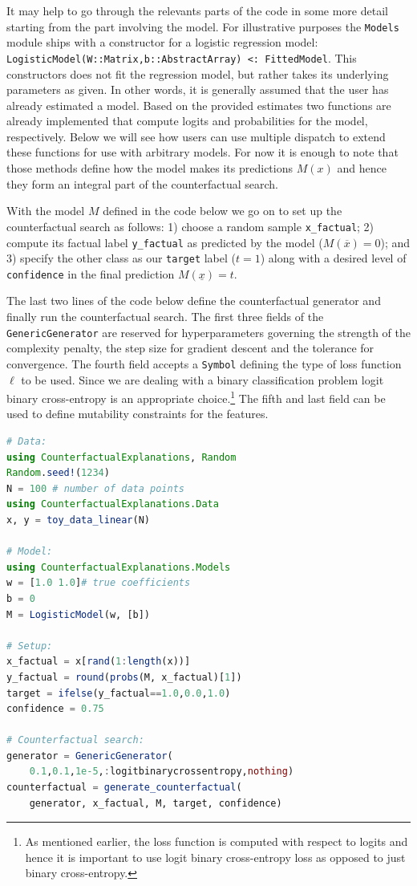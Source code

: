 \documentclass{juliacon}
\begin{document}
It may help to go through the relevants parts of the code in some more
detail starting from the part involving the model. For illustrative
purposes the \texttt{Models} module ships with a constructor for a
logistic regression model:
\texttt{LogisticModel(W::Matrix,b::AbstractArray)\ \textless{}:\ FittedModel}.
This constructors does not fit the regression model, but rather takes
its underlying parameters as given. In other words, it is generally
assumed that the user has already estimated a model. Based on the
provided estimates two functions are already implemented that compute
logits and probabilities for the model, respectively. Below we will see
how users can use multiple dispatch to extend these functions for use
with arbitrary models. For now it is enough to note that those methods
define how the model makes its predictions \(M(x)\) and hence they form
an integral part of the counterfactual search.

With the model \(M\) defined in the code below we go on to set up the
counterfactual search as follows: 1) choose a random sample
\texttt{x\_factual}; 2) compute its factual label \texttt{y\_factual} as
predicted by the model (\(M(\overline{x})=0\)); and 3) specify the other
class as our \texttt{target} label (\(t=1\)) along with a desired level
of \texttt{confidence} in the final prediction \(M(\underline{x})=t\).

The last two lines of the code below define the counterfactual generator
and finally run the counterfactual search. The first three fields of the
\texttt{GenericGenerator} are reserved for hyperparameters governing the
strength of the complexity penalty, the step size for gradient descent
and the tolerance for convergence. The fourth field accepts a
\texttt{Symbol} defining the type of loss function \(\ell\) to be used.
Since we are dealing with a binary classification problem logit binary
cross-entropy is an appropriate choice.\footnote{As mentioned earlier,
  the loss function is computed with respect to logits and hence it is
  important to use logit binary cross-entropy loss as opposed to just
  binary cross-entropy.} The fifth and last field can be used to define
mutability constraints for the features.

\begin{lstlisting}[language = Julia]
# Data:
using CounterfactualExplanations, Random
Random.seed!(1234)
N = 100 # number of data points
using CounterfactualExplanations.Data
x, y = toy_data_linear(N) 

# Model:
using CounterfactualExplanations.Models 
w = [1.0 1.0]# true coefficients
b = 0
M = LogisticModel(w, [b])

# Setup:
x_factual = x[rand(1:length(x))]
y_factual = round(probs(M, x_factual)[1])
target = ifelse(y_factual==1.0,0.0,1.0) 
confidence = 0.75 

# Counterfactual search:
generator = GenericGenerator(
    0.1,0.1,1e-5,:logitbinarycrossentropy,nothing)
counterfactual = generate_counterfactual(
    generator, x_factual, M, target, confidence)
\end{lstlisting}
\end{document}
